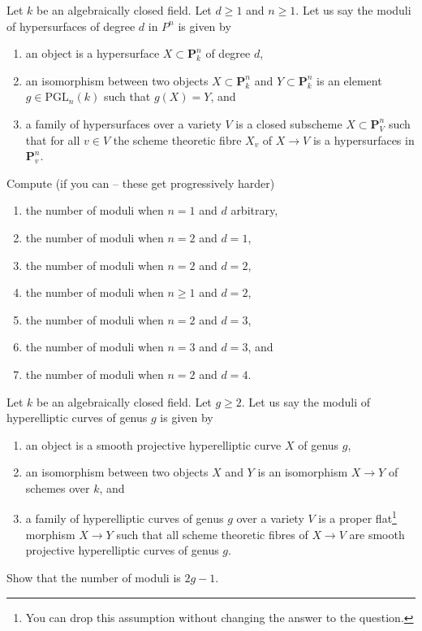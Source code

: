 \begin{exercise}
\label{exercise-number-moduli-lines-conics}
Let $k$ be an algebraically closed field. Let $d \geq 1$ and $n \geq 1$.
Let us say the moduli of hypersurfaces of degree $d$ in $P^n$ is given by
\begin{enumerate}
\item an object is a hypersurface $X \subset \mathbf{P}^n_k$
of degree $d$,
\item an isomorphism between two objects $X \subset \mathbf{P}^n_k$
and $Y \subset \mathbf{P}^n_k$ is an element $g \in \text{PGL}_n(k)$
such that $g(X) = Y$, and
\item a family of hypersurfaces over a variety $V$ is a closed
subscheme $X \subset \mathbf{P}^n_V$ such that for all $v \in V$
the scheme theoretic fibre $X_v$ of $X \to V$ is
a hypersurfaces in $\mathbf{P}^n_v$.
\end{enumerate}
Compute (if you can -- these get progressively harder)
\begin{enumerate}
\item the number of moduli when $n = 1$ and $d$ arbitrary,
\item the number of moduli when $n = 2$ and $d = 1$,
\item the number of moduli when $n = 2$ and $d = 2$,
\item the number of moduli when $n \geq 1$ and $d = 2$,
\item the number of moduli when $n = 2$ and $d = 3$,
\item the number of moduli when $n = 3$ and $d = 3$, and
\item the number of moduli when $n = 2$ and $d = 4$.
\end{enumerate}
\end{exercise}

\begin{exercise}
\label{exercise-number-moduli-hyperelliptic}
Let $k$ be an algebraically closed field. Let $g \geq 2$.
Let us say the moduli of hyperelliptic curves of genus $g$ is given by
\begin{enumerate}
\item an object is a smooth projective hyperelliptic curve $X$
of genus $g$,
\item an isomorphism between two objects $X$ and $Y$ is an
isomorphism $X \to Y$ of schemes over $k$, and
\item a family of hyperelliptic curves of genus $g$ over a variety $V$ is a
proper flat\footnote{You can drop this assumption without changing
the answer to the question.} morphism $X \to Y$ such that all scheme
theoretic fibres of $X \to V$ are smooth projective hyperelliptic curves
of genus $g$.
\end{enumerate}
Show that the number of moduli is $2g - 1$.
\end{exercise}





